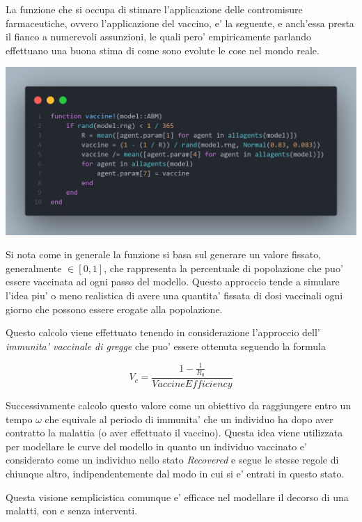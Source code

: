 La funzione che si occupa di stimare l'applicazione delle contromisure farmaceutiche, ovvero l'applicazione del vaccino,
e' la seguente, e anch'essa presta il fianco a numerevoli assunzioni, le quali pero' empiricamente parlando
effettuano una buona stima di come sono evolute le cose nel mondo reale.

\begin{minipage}{\linewidth}
	\centering
	\includegraphics[width=\textwidth]{img/vaccine.png}
	\label{fig:vaccine}
\end{minipage}

Si nota come in generale la funzione si basa sul generare un valore fissato, generalmente $\in [0,1]$, che 
rappresenta la percentuale di popolazione che puo' essere vaccinata ad ogni passo del modello.
Questo approccio tende a simulare l'idea piu' o meno realistica di avere una quantita' fissata di 
dosi vaccinali ogni giorno che possono essere erogate alla popolazione. 

Questo calcolo viene effettuato tenendo in considerazione l'approccio dell' \emph{immunita' vaccinale di gregge} che puo'
essere ottenuta seguendo la formula 

$$V_c = \frac{1-\frac{1}{R_0}}{VaccineEfficiency}$$

Successivamente calcolo questo valore come un obiettivo da raggiungere entro un tempo $\omega$ che equivale al 
periodo di immunita' che un individuo ha dopo aver contratto la malattia (o aver effettuato il vaccino). 
Questa idea viene utilizzata per modellare le curve del modello in quanto un individuo vaccinato e' considerato 
come un individuo nello stato \emph{Recovered} e segue le stesse regole di chiunque altro, indipendentemente
dal modo in cui si e' entrati in questo stato. 

Questa visione semplicistica comunque e' efficace nel modellare il decorso di una malatti, con e senza interventi.

